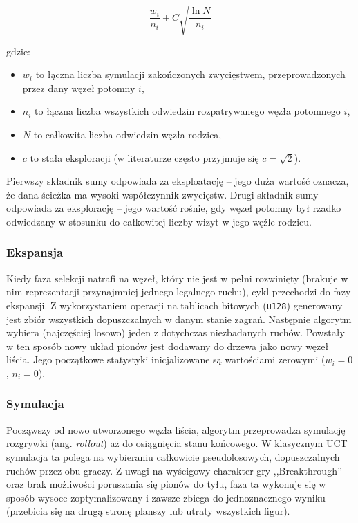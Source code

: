 \documentclass{article}
\begin{document}
$$\frac{w_i}{n_i} + C \sqrt{\frac{\ln N}{n_i}}$$

\noindent
gdzie:

\begin{itemize}
    \item $w_i$ to łączna liczba symulacji zakończonych zwycięstwem, przeprowadzonych przez dany węzeł potomny $i$,
    \item $n_i$ to łączna liczba wszystkich odwiedzin rozpatrywanego węzła potomnego $i$,
    \item $N$ to całkowita liczba odwiedzin węzła-rodzica,
    \item $c$ to stała eksploracji (w literaturze często przyjmuje się $c = \sqrt{2}$).
\end{itemize}

\noindent
Pierwszy składnik sumy odpowiada za eksploatację -- jego duża wartość oznacza, że dana ścieżka ma wysoki współczynnik zwycięstw. Drugi składnik sumy odpowiada za eksplorację -- jego wartość rośnie, gdy węzeł potomny był rzadko odwiedzany w stosunku do całkowitej liczby wizyt w jego węźle-rodzicu.

\subsubsection{Ekspansja}

Kiedy faza selekcji natrafi na węzeł, który nie jest w pełni rozwinięty (brakuje w nim reprezentacji przynajmniej jednego legalnego ruchu), cykl przechodzi do fazy ekspansji. Z wykorzystaniem operacji na tablicach bitowych (\texttt{u128}) generowany jest zbiór wszystkich dopuszczalnych w danym stanie zagrań. Następnie algorytm wybiera (najczęściej losowo) jeden z dotychczas niezbadanych ruchów. Powstały w ten sposób nowy układ pionów jest dodawany do drzewa jako nowy węzeł liścia. Jego początkowe statystyki inicjalizowane są wartościami zerowymi ($w_i = 0$, $n_i = 0$).

\subsubsection{Symulacja}

Począwszy od nowo utworzonego węzła liścia, algorytm przeprowadza symulację rozgrywki (ang. \textit{rollout}) aż do osiągnięcia stanu końcowego. W klasycznym UCT symulacja ta polega na wybieraniu całkowicie pseudolosowych, dopuszczalnych ruchów przez obu graczy. Z uwagi na wyścigowy charakter gry ,,Breakthrough'' oraz brak możliwości poruszania się pionów do tyłu, faza ta wykonuje się w sposób wysoce zoptymalizowany i zawsze zbiega do jednoznacznego wyniku (przebicia się na drugą stronę planszy lub utraty wszystkich figur).
\end{document}
